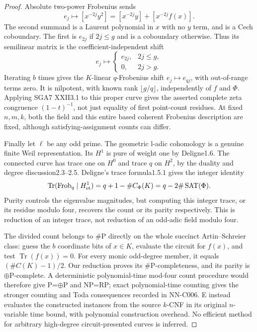 \begin{proof}
Absolute two-power Frobenius sends
\[
 e_j\longmapsto[x^{-2j}y^2]
       =[x^{-2j}y]+[x^{-2j}f(x)].
\]
The second summand is a Laurent polynomial in $x$ with no $y$ term, and is a Cech coboundary. The first is $e_{2j}$ if $2j\leq g$ and is a coboundary otherwise. Thus its semilinear matrix is the coefficient-independent shift
\[
 e_j\longmapsto
 \begin{cases}e_{2j},&2j\leq g,\\0,&2j>g.\end{cases}
\]
Iterating $b$ times gives the $K$-linear $q$-Frobenius shift $e_j\mapsto e_{qj}$, with out-of-range terms zero. It is nilpotent, with known rank $\lfloor g/q\rfloor$, independently of $f$ and $\Phi$. Applying SGA7 XXII3.1 to this proper curve gives the asserted complete zeta congruence $(1-t)^{-1}$, not just equality of first point-count residues. At fixed $n,m,k$, both the field and this entire based coherent Frobenius description are fixed, although satisfying-assignment counts can differ.

Finally let $\ell$ be any odd prime. The geometric l-adic cohomology is a genuine finite Weil representation. Its $H^1$ is pure of weight one by Deligne1.6. The connected curve has trace one on $H^0$ and trace $q$ on $H^2$, by the duality and degree discussion2.3--2.5. Deligne's trace formula1.5.1 gives the integer identity
\[
 \operatorname{Tr}(\operatorname{Frob}_q\mid H^1_{\rm et})
           =q+1-\#C_\Phi(K)
           =q-2\#\operatorname{SAT}(\Phi).
\]
Purity controls the eigenvalue magnitudes, but computing this integer trace, or its residue modulo four, recovers the count or its parity respectively. This is reduction of an integer trace, not reduction of an odd-adic field modulo four.

The divided count belongs to $\#\mathrm P$ directly on the whole succinct Artin--Schreier class: guess the $b$ coordinate bits of $x\in K$, evaluate the circuit for $f(x)$, and test $\operatorname{Tr}(f(x))=0$. For every monic odd-degree member, it equals $(\#C(K)-1)/2$. Our reduction proves its $\#\mathrm P$-completeness, and its parity is $\oplus\mathrm P$-complete. A deterministic polynomial-time mod-four count procedure would therefore give P=$\oplus$P and NP=RP; exact polynomial-time counting gives the stronger counting and Toda consequences recorded in NN-C006. E instead evaluates the constructed instances from the source $k$-CNF in its original $n$-variable time bound, with polynomial construction overhead. No efficient method for arbitrary high-degree circuit-presented curves is inferred.
\end{proof}
